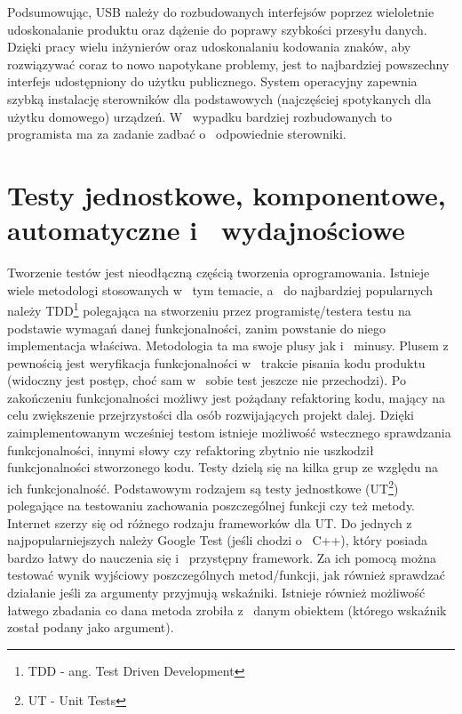 \documentclass{BscUS}
\begin{document}
\newline
\indent Podsumowując, USB należy do rozbudowanych interfejsów poprzez wieloletnie udoskonalanie produktu oraz dążenie do poprawy szybkości przesyłu danych. Dzięki pracy wielu inżynierów oraz udoskonalaniu kodowania znaków, aby rozwiązywać coraz to nowo napotykane problemy, jest to najbardziej powszechny interfejs udostępniony do użytku publicznego. System operacyjny zapewnia szybką instalację sterowników dla podstawowych (najczęściej spotykanych dla użytku domowego) urządzeń. W~ wypadku bardziej rozbudowanych to programista ma za zadanie zadbać o~ odpowiednie sterowniki.
\section{Testy jednostkowe, komponentowe, automatyczne i~ wydajnościowe}
\indent Tworzenie testów jest nieodłączną częścią tworzenia oprogramowania. Istnieje wiele metodologi stosowanych w~ tym temacie, a~ do najbardziej popularnych należy TDD\footnote{TDD - ang. Test Driven Development} polegająca na stworzeniu przez programistę/testera testu na podstawie wymagań danej funkcjonalności, zanim powstanie do niego implementacja właściwa. Metodologia ta ma swoje plusy jak i~ minusy. Plusem z~ pewnością jest weryfikacja funkcjonalności w~ trakcie pisania kodu produktu (widoczny jest postęp, choć sam w~ sobie test jeszcze nie przechodzi). Po zakończeniu funkcjonalności możliwy jest pożądany refaktoring kodu, mający na celu zwiększenie przejrzystości dla osób rozwijających projekt dalej. Dzięki zaimplementowanym wcześniej testom istnieje możliwość wstecznego sprawdzania funkcjonalności, innymi słowy czy refaktoring zbytnio nie uszkodził funkcjonalności stworzonego kodu.
\newline
\indent Testy dzielą się na kilka grup ze względu na ich funkcjonalność. Podstawowym rodzajem są testy jednostkowe (UT\footnote{UT - Unit Tests}) polegające na testowaniu zachowania poszczególnej funkcji czy też metody. Internet szerzy się od różnego rodzaju frameworków dla UT. Do jednych z~ najpopularniejszych należy Google Test (jeśli chodzi o~ C++), który posiada bardzo łatwy do nauczenia się i~ przystępny framework. Za ich pomocą można testować wynik wyjściowy poszczególnych metod/funkcji, jak również sprawdzać działanie jeśli za argumenty przyjmują wskaźniki. Istnieje również możliwość łatwego zbadania co dana metoda zrobiła z~ danym obiektem (którego wskaźnik został podany jako argument).
\newline
\end{document}
